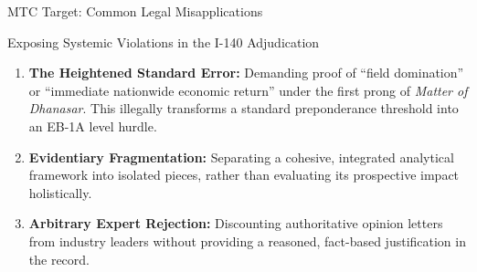 \documentclass[11pt]{beamer}
\begin{document}
	\begin{frame}{MTC Target: Common Legal Misapplications}
		\scriptsize
		\begin{block}{Exposing Systemic Violations in the I-140 Adjudication}
			\begin{enumerate}
				\item \textbf{The Heightened Standard Error:} Demanding proof of ``field domination'' or ``immediate nationwide economic return'' under the first prong of \textit{Matter of Dhanasar}. This illegally transforms a standard preponderance threshold into an EB-1A level hurdle.
				\item \textbf{Evidentiary Fragmentation:} Separating a cohesive, integrated analytical framework into isolated pieces, rather than evaluating its prospective impact holistically.
				\item \textbf{Arbitrary Expert Rejection:} Discounting authoritative opinion letters from industry leaders without providing a reasoned, fact-based justification in the record.
			\end{enumerate}
		\end{block}
	\end{frame}
	
\end{document}
